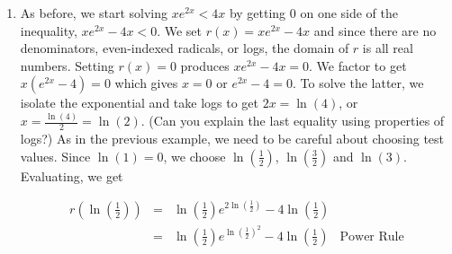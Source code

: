 {\begin{enumerate}
{}


\item  As before, we start solving $x e^{2x} < 4x$ by getting $0$ on one side of the inequality, $x e^{2x} - 4x < 0$.   We set $r(x) = xe^{2x} - 4x$ and since there are no denominators, even-indexed radicals, or logs, the domain of $r$ is all real numbers.  Setting $r(x) = 0$  produces $x e^{2x} - 4x  = 0$. We factor to get $x \left(e^{2x} - 4\right)  = 0$ which gives $x=0$ or $e^{2x} - 4 = 0$.  To solve the latter, we isolate the exponential and take logs to get $2x = \ln(4)$, or $x = \frac{\ln(4)}{2} = \ln(2)$.  (Can you explain the last equality using properties of logs?)  As in the previous example, we need to be careful about choosing test values.  Since $\ln(1) = 0$, we choose $\ln\left(\frac{1}{2}\right)$, $\ln\left(\frac{3}{2}\right)$ and $\ln(3)$.  Evaluating, we get 

\[\begin{array}{rclr}

r\left(\ln\left(\frac{1}{2}\right)\right) & = & \ln\left(\frac{1}{2}\right) e^{2\ln\left(\frac{1}{2}\right)} - 4\ln\left(\frac{1}{2}\right) & \\

&= & \ln\left(\frac{1}{2}\right)e^{\ln\left(\frac{1}{2}\right)^2}- 4\ln\left(\frac{1}{2}\right) & \text{Power Rule} \\


\end{array}\]
\end{enumerate}}
